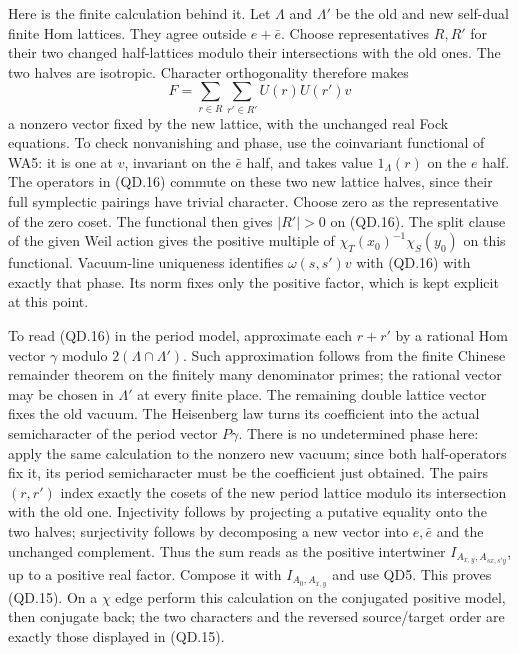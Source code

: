 Here is the finite calculation behind it.  Let $\Lambda$ and
$\Lambda'$ be the old and new self-dual finite Hom lattices.
They agree outside $e+\bar e$.  Choose representatives $R,R'$
for their two changed half-lattices modulo their intersections
with the old ones.  The two halves are isotropic.  Character
orthogonality therefore makes
\[
                  F=\sum_{r\in R}\sum_{r'\in R'}
                                      U(r)U(r')v          \tag{QD.16}
\]
a nonzero vector fixed by the new lattice, with the unchanged
real Fock equations.  To check nonvanishing and phase, use the
coinvariant functional of WA5: it is one at $v$, invariant on
the $\bar e$ half, and takes value $1_{\Lambda}(r)$ on the
$e$ half.  The operators in (QD.16) commute on these two new
lattice halves, since their full symplectic pairings have
trivial character.  Choose zero as the representative of the
zero coset.  The functional then gives $|R'|>0$ on (QD.16).
The split clause of the given Weil action gives the positive
multiple of $\chi_T(x_0)^{-1}\chi_S(y_0)$ on this functional.
Vacuum-line uniqueness identifies $\omega(s,s')v$ with (QD.16)
with exactly that phase.  Its norm fixes only the positive
factor, which is kept explicit at this point.

To read (QD.16) in the period model, approximate each
$r+r'$ by a rational Hom vector $\gamma$ modulo
$2(\Lambda\cap\Lambda')$.  Such approximation follows from
the finite Chinese remainder theorem on the finitely many
denominator primes; the rational vector may be chosen in
$\Lambda'$ at every finite place.  The remaining double
lattice vector fixes the old vacuum.  The Heisenberg law
turns its coefficient into the actual semicharacter of the
period vector $P\gamma$.  There is no undetermined phase here:
apply the same calculation to the nonzero new vacuum; since
both half-operators fix it, its period semicharacter must be
the coefficient just obtained.  The pairs $(r,r')$ index
exactly the cosets of the new period lattice modulo its
intersection with the old one.  Injectivity follows by
projecting a putative equality onto the two halves; surjectivity
follows by decomposing a new vector into $e,\bar e$ and the
unchanged complement.  Thus the sum reads as the positive
intertwiner $I_{A_{x,y},A_{sx,s'y}}$, up to a positive real
factor.  Compose it with $I_{A_0,A_{x,y}}$ and use QD5.  This
proves (QD.15).  On a $\chi$ edge perform this calculation on
the conjugated positive model, then conjugate back; the two
characters and the reversed source/target order are exactly
those displayed in (QD.15).

